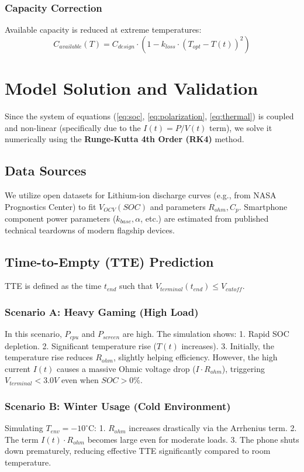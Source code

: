 \documentclass[12pt]{article}
\begin{document}
\subsubsection{Capacity Correction}
Available capacity is reduced at extreme temperatures:
\begin{equation}
    C_{available}(T) = C_{design} \cdot (1 - k_{loss} \cdot (T_{opt} - T(t))^2)
\end{equation}

\section{Model Solution and Validation}

Since the system of equations (\ref{eq:soc}, \ref{eq:polarization}, \ref{eq:thermal}) is coupled and non-linear (specifically due to the $I(t) = P/V(t)$ term), we solve it numerically using the \textbf{Runge-Kutta 4th Order (RK4)} method.

\subsection{Data Sources}
We utilize open datasets for Lithium-ion discharge curves (e.g., from NASA Prognostics Center) to fit $V_{OCV}(SOC)$ and parameters $R_{ohm}, C_p$. Smartphone component power parameters ($k_{base}, \alpha$, etc.) are estimated from published technical teardowns of modern flagship devices.

\subsection{Time-to-Empty (TTE) Prediction}
TTE is defined as the time $t_{end}$ such that $V_{terminal}(t_{end}) \le V_{cutoff}$.

\subsubsection{Scenario A: Heavy Gaming (High Load)}
In this scenario, $P_{cpu}$ and $P_{screen}$ are high. The simulation shows:
1. Rapid SOC depletion.
2. Significant temperature rise ($T(t)$ increases).
3. Initially, the temperature rise reduces $R_{ohm}$, slightly helping efficiency. However, the high current $I(t)$ causes a massive Ohmic voltage drop ($I \cdot R_{ohm}$), triggering $V_{terminal} < 3.0V$ even when $SOC > 0\%$.

\subsubsection{Scenario B: Winter Usage (Cold Environment)}
Simulating $T_{env} = -10^{\circ}$C:
1. $R_{ohm}$ increases drastically via the Arrhenius term.
2. The term $I(t) \cdot R_{ohm}$ becomes large even for moderate loads.
3. The phone shuts down prematurely, reducing effective TTE significantly compared to room temperature.
\end{document}
